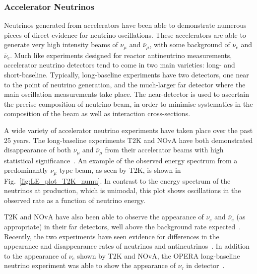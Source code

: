 \subsubsection{Accelerator Neutrinos}
Neutrinos generated from accelerators have been able to demonstrate numerous pieces of direct evidence for neutrino oscillations. These accelerators are able to generate very high intensity beams of $\nu_{\mu}$ and $\bar{\nu}_{\mu}$, with some background of $\nu_{e}$ and $\bar{\nu}_{e}$. Much like experiments designed for reactor antineutrino measurements, accelerator neutrino detectors tend to come in two main varieties: long- and short-baseline. Typically, long-baseline experiments have two detectors, one near to the point of neutrino generation, and the much-larger far detector where the main oscillation measurements take place. The near-detector is used to ascertain the precise composition of neutrino beam, in order to minimise systematics in the composition of the beam as well as interaction cross-sections.

A wide variety of accelerator neutrino experiments have taken place over the past 25 years. The long-baseline experiments T2K and NOvA have both demonstrated disappearance of both $\nu_{\mu}$ and $\bar{\nu}_{\mu}$ from their accelerator beams with high statistical significance~\cite{abeImprovedConstraintsNeutrino2021,adamsonConstraintsOscillationParameters2017}. %
An example of the observed energy spectrum from a predominantly $\nu_{\mu}$-type beam, as seen by T2K, is shown in Fig.~\ref{fig:LE_plot_T2K_numu}. In contrast to the energy spectrum of the neutrinos at production, which is unimodal, this plot shows oscillations in the observed rate as a function of neutrino energy. 

T2K and NOvA have also been able to observe the appearance of $\nu_{e}$ and $\bar{\nu}_{e}$ (as appropriate) in their far detectors, well above the background rate expected~\cite{abeObservationElectronNeutrino2014,adamsonFirstMeasurementElectron2016}. Recently, the two experiments have seen evidence for differences in the appearance and disappearance rates of neutrinos and antineutrinos~\cite{abeConstraintMatterAntimatter2020,aceroFirstMeasurementNeutrino2019}. %
In addition to the appearance of $\nu_{e}$ shown by T2K and NOvA, the OPERA long-baseline neutrino experiment was able to show the appearance of $\nu_{\tau}$ in detector~\cite{agafonovaFinalResultsOPERA2018}. %
 

